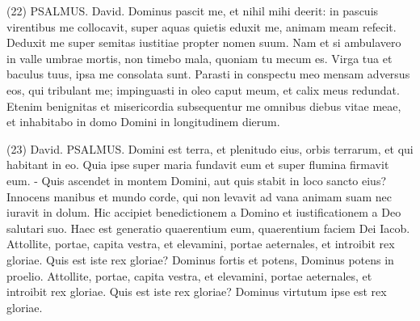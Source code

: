 \begin{biblechapter}  (22) 
\verse  PSALMUS. David. Dominus pascit me, et nihil mihi deerit: 
\verse in pascuis virentibus me collocavit, super aquas quietis eduxit me, 
\verse animam meam refecit. Deduxit me super semitas iustitiae propter nomen suum. 
\verse Nam et si ambulavero in valle umbrae mortis, non timebo mala, quoniam tu mecum es. Virga tua et baculus tuus, ipsa me consolata sunt. 
\verse Parasti in conspectu meo mensam adversus eos, qui tribulant me; impinguasti in oleo caput meum, et calix meus redundat. 
\verse Etenim benignitas et misericordia subsequentur me omnibus diebus vitae meae, et inhabitabo in domo Domini in longitudinem dierum. 
\end{biblechapter}

\begin{biblechapter}  (23) 
\verse  David. PSALMUS. Domini est terra, et plenitudo eius, orbis terrarum, et qui habitant in eo. 
\verse Quia ipse super maria fundavit eum et super flumina firmavit eum. - 
\verse Quis ascendet in montem Domini, aut quis stabit in loco sancto eius? 
\verse Innocens manibus et mundo corde, qui non levavit ad vana animam suam nec iuravit in dolum. 
\verse Hic accipiet benedictionem a Domino et iustificationem a Deo salutari suo. 
\verse Haec est generatio quaerentium eum, quaerentium faciem Dei Iacob. 
\verse Attollite, portae, capita vestra, et elevamini, portae aeternales, et introibit rex gloriae. 
\verse Quis est iste rex gloriae? Dominus fortis et potens, Dominus potens in proelio. 
\verse Attollite, portae, capita vestra, et elevamini, portae aeternales, et introibit rex gloriae. 
\verse Quis est iste rex gloriae? Dominus virtutum ipse est rex gloriae. 
\end{biblechapter}

